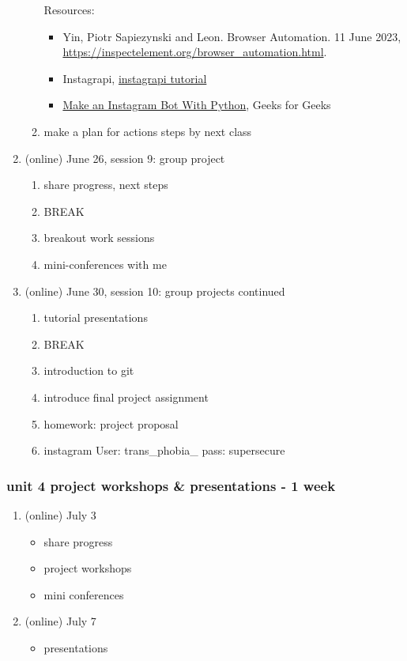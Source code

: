 \documentclass[11pt]{article}
\begin{document}
\begin{enumerate}
\begin{enumerate}
Resources:
\begin{itemize}
\item Yin, Piotr Sapiezynski and Leon. Browser Automation. 11 June 2023,
\url{https://inspectelement.org/browser\_automation.html}.
\item Instagrapi, \href{https://www.youtube.com/watch?v=cW7kMeOUr20}{instagrapi tutorial}
\item \href{https://www.geeksforgeeks.org/make-an-instagram-bot-with-python/}{Make an Instagram Bot With Python}, Geeks for Geeks
\end{itemize}

\item make a plan for actions steps by next class
\label{sec:org728e0f8}
\end{enumerate}
\item (online) June 26, session 9: group project
\label{sec:org558d42b}
\begin{enumerate}
\item share progress, next steps
\label{sec:org328d209}
\item BREAK
\label{sec:org9bf3409}
\item breakout work sessions
\label{sec:orgd719be9}
\item mini-conferences with me
\label{sec:orgf0b5365}
\end{enumerate}
\item (online) June 30, session 10: group projects continued
\label{sec:orgc01f050}
\begin{enumerate}
\item tutorial presentations
\label{sec:org2475a7e}
\item BREAK
\label{sec:org68b631d}
\item introduction to git
\label{sec:org6ec880f}
\item introduce final project assignment
\label{sec:org4c85d39}
\item homework: project proposal
\label{sec:orge838c28}
\item instagram
\label{sec:orgc917606}
User: trans\_phobia\_
pass: supersecure
\end{enumerate}
\end{enumerate}

\subsubsection{unit 4 project workshops \& presentations - 1 week}
\label{sec:org285f75e}
\begin{enumerate}
\item (online) July 3
\label{sec:org5b3c3e0}
\begin{itemize}
\item share progress
\item project workshops
\item mini conferences
\end{itemize}
\item (online) July 7
\label{sec:org020d9a9}
\begin{itemize}
\item presentations
\end{itemize}
\end{enumerate}
\end{document}
